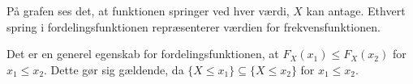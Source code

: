 \begin{eks}
På grafen ses det, at funktionen springer ved hver værdi, $X$ kan antage. Ethvert spring i fordelingsfunktionen repræsenterer værdien for frekvensfunktionen. 
\end{eks}

Det er en generel egenskab for fordelingsfunktionen, at $F_X(x_1)\leq F_X(x_2)$ for $x_1\leq x_2$. Dette gør sig gældende, da $\{X\leq x_1\}\subseteq \{X\leq x_2\}$ for $x_1\leq x_2$.

